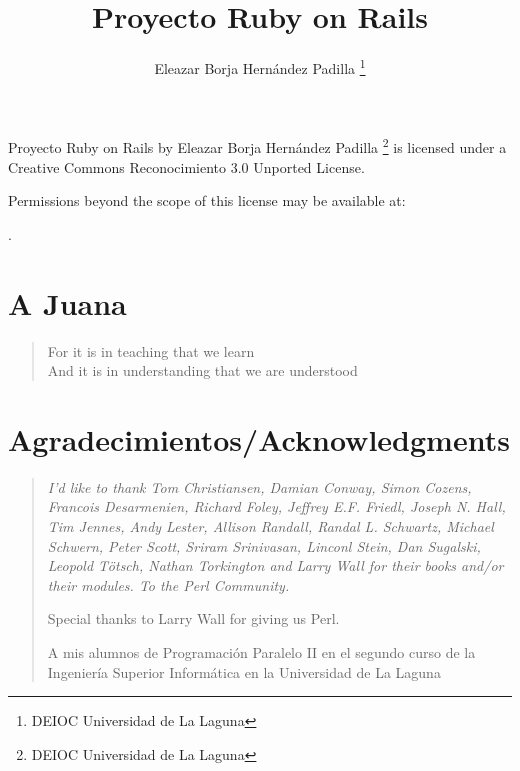\documentclass[11pt,a4paper,oneside,onecolumn]{book}
\title{Proyecto Ruby on Rails}
\author{Eleazar Borja Hernández Padilla \thanks{DEIOC Universidad de La Laguna}}
\begin{document}
\topmargin=5pt
\maketitle

\null\vfill
\noindent
\begin{center}
Proyecto Ruby on Rails
by
Eleazar Borja Hernández Padilla \thanks{DEIOC Universidad de La Laguna}
is licensed under a Creative Commons Reconocimiento 3.0 Unported License.

Permissions beyond the scope of this license may be available at:


.
\end{center}

\newpage





\tableofcontents 
\listoffigures
\listoftables




\chapter*{A Juana}
\vspace{8cm}
{\it
\begin{Large}
\begin{verse}
\flushright 
For it is in teaching that we learn\\
And it is in understanding that we are understood
\end{verse}
\end{Large}
}

\chapter*{Agradecimientos/Acknowledgments}
\begin{verse}
\flushright \it
I'd like to thank 
Tom Christiansen, 
Damian Conway, 
Simon Cozens,
Francois Desarmenien,
Richard Foley,
Jeffrey E.F. Friedl, 
Joseph N. Hall, 
Tim Jennes,
Andy Lester,
Allison Randall,
Randal L. Schwartz, 
Michael Schwern, 
Peter Scott, 
Sriram Srinivasan, 
Linconl Stein, 
Dan Sugalski,
Leopold Tötsch,
Nathan Torkington and 
Larry Wall 
for their books and/or their modules. 
To the Perl Community.

\vspace{2cm}

Special thanks to Larry Wall for giving us Perl.

\vspace{2cm}

A mis alumnos de 
Programación Paralelo II en el segundo curso de la Ingeniería 
Superior Informática en la Universidad de La Laguna
\end{verse}
\end{document}
